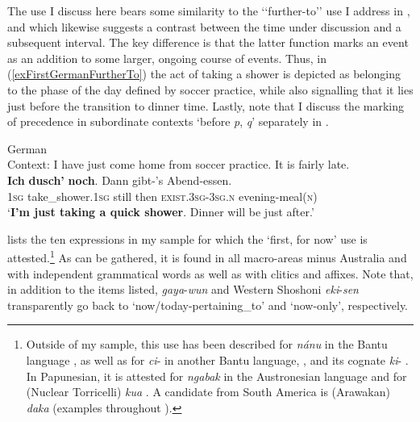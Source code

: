 The use I discuss here bears some similarity to the \lq\lq{}further-to\rq\rq{ }use I address in , and which likewise suggests a contrast between the time under discussion and a subsequent interval. The key difference is that the latter function marks an event as an addition to some larger, ongoing course of events. Thus, in (\ref{exFirstGermanFurtherTo}) the act of taking a shower is depicted as belonging to the phase of the day defined by soccer practice, while also signalling that it lies just before the transition to dinner time. Lastly, note that 
I discuss the marking of precedence in subordinate contexts \lq before \textit{p}, \textit{q}\rq{ }separately in .

\begin{exe}
	\ex German\label{exFirstGermanFurtherTo}\\
	 Context: I have just come home from soccer practice. It is fairly late.\\
	\gll \textbf{Ich} \textbf{dusch'} \textbf{noch}. Dann gibt-'s Abend-essen.\\
	1\textsc{sg} take\_shower.1\textsc{sg} still then \textsc{exist}.3\textsc{sg}-3\textsc{sg}.\textsc{n} evening-meal(\textsc{n})\\
	\glt \lq \textbf{I'm just taking a quick shower}. Dinner will be just after.' \parencite[16]{Beck2019}
\end{exe}

 lists the ten expressions in my sample for which the \lq first, for now\rq{ }use is attested.\footnote{Outside of my sample, this use has been described for \textit{nánu} in the Bantu language  \parencite{NassensteinPasch2021}, as well as for \mbox{\textit{ci}-} in another Bantu language,  \parencite[130–131]{Horton1949}, and its  cognate \mbox{\textit{ki}-} \parencite[103–104]{Coupez1955}. In Papunesian, it is attested for \textit{ngabak} in the Austronesian language  \parencite[222–223]{vonPrince2015} and for  (Nuclear Torricelli) \textit{kua} \parencite[477–479]{Wilson2017}. A candidate from South America is  (Arawakan) \textit{daka} (examples throughout \cite{Aikhenvald2003}).} As can be gathered, it is found in all macro-areas minus Australia and with independent grammatical words as well as with clitics and affixes. Note that, in addition to the items listed,  \textit{gaya}-\textit{wun} and Western Shoshoni \textit{eki}-\textit{sen} transparently go back to \lq{}now/today-pertaining\_to\rq{ }and \lq now-only\rq{}, respectively.\largerpage

